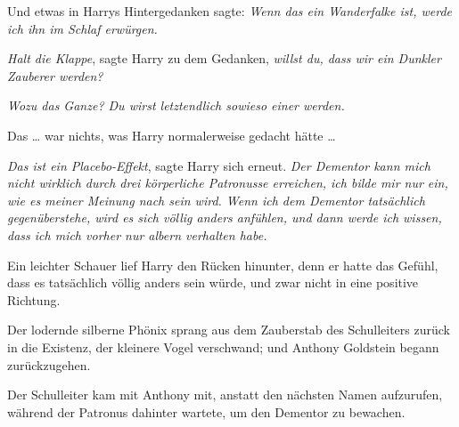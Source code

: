 Und etwas in Harrys Hintergedanken sagte: \emph{Wenn das ein Wanderfalke ist, werde ich ihn im Schlaf erwürgen.}

\emph{Halt die Klappe}, sagte Harry zu dem Gedanken, \emph{willst du, dass wir ein Dunkler Zauberer werden?}

\emph{Wozu das Ganze? Du wirst letztendlich sowieso einer werden.}

Das … war nichts, was Harry normalerweise gedacht hätte …

\emph{Das ist ein Placebo-Effekt}, sagte Harry sich erneut. \emph{Der Dementor kann mich nicht wirklich durch drei körperliche Patronusse erreichen, ich bilde mir nur ein, wie es meiner Meinung nach sein wird. Wenn ich dem Dementor tatsächlich gegenüberstehe, wird es sich völlig anders anfühlen, und dann werde ich wissen, dass ich mich vorher nur albern verhalten habe.}

Ein leichter Schauer lief Harry den Rücken hinunter, denn er hatte das Gefühl, dass es tatsächlich völlig anders sein würde, und zwar nicht in eine positive Richtung.

Der lodernde silberne Phönix sprang aus dem Zauberstab des Schulleiters zurück in die Existenz, der kleinere Vogel verschwand; und Anthony Goldstein begann zurückzugehen.

Der Schulleiter kam mit Anthony mit, anstatt den nächsten Namen aufzurufen, während der Patronus dahinter wartete, um den Dementor zu bewachen.

